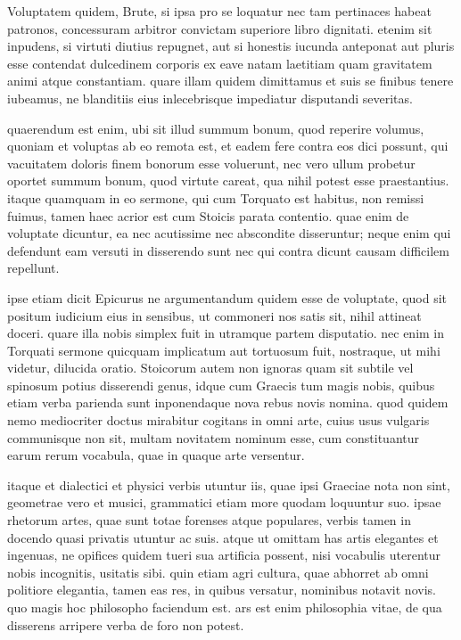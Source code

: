  Voluptatem quidem, Brute, si ipsa pro se loquatur nec tam pertinaces habeat patronos, concessuram arbitror convictam superiore libro dignitati. etenim sit inpudens, si virtuti diutius repugnet, aut si honestis iucunda anteponat aut pluris esse contendat dulcedinem corporis ex eave natam laetitiam quam gravitatem animi atque constantiam. quare illam quidem dimittamus et suis se finibus tenere iubeamus, ne blanditiis eius inlecebrisque impediatur disputandi severitas.

 quaerendum est enim, ubi sit illud summum bonum, quod reperire volumus, quoniam et voluptas ab eo remota est, et eadem fere contra eos dici possunt, qui vacuitatem doloris finem bonorum esse voluerunt, nec vero ullum probetur oportet summum bonum, quod virtute careat, qua nihil potest esse praestantius. itaque quamquam in eo sermone, qui cum Torquato est habitus, non remissi fuimus, tamen haec acrior est cum Stoicis parata contentio. quae enim de voluptate dicuntur, ea nec acutissime nec abscondite disseruntur; neque enim qui defendunt eam versuti in disserendo sunt nec qui contra dicunt causam difficilem repellunt.

 ipse etiam dicit Epicurus ne argumentandum quidem esse de voluptate, quod sit positum iudicium eius in sensibus, ut commoneri nos satis sit, nihil attineat doceri. quare illa nobis simplex fuit in utramque partem disputatio. nec enim in Torquati sermone quicquam implicatum aut tortuosum fuit, nostraque, ut mihi videtur, dilucida oratio. Stoicorum autem non ignoras quam sit subtile vel spinosum potius disserendi genus, idque cum Graecis tum magis nobis, quibus etiam verba parienda sunt inponendaque nova rebus novis nomina. quod quidem nemo mediocriter doctus mirabitur cogitans in omni arte, cuius usus vulgaris communisque non sit, multam novitatem nominum esse, cum constituantur earum rerum vocabula, quae in quaque arte versentur.

 itaque et dialectici et physici verbis utuntur iis, quae ipsi Graeciae nota non sint, geometrae vero et musici, grammatici etiam more quodam loquuntur suo. ipsae rhetorum artes, quae sunt totae forenses atque populares, verbis tamen in docendo quasi privatis utuntur ac suis. atque ut omittam has artis elegantes et ingenuas, ne opifices quidem tueri sua artificia possent, nisi vocabulis uterentur nobis incognitis, usitatis sibi. quin etiam agri cultura, quae abhorret ab omni politiore elegantia, tamen eas res, in quibus versatur, nominibus notavit novis. quo magis hoc philosopho faciendum est. ars est enim philosophia vitae, de qua disserens arripere verba de foro non potest.

